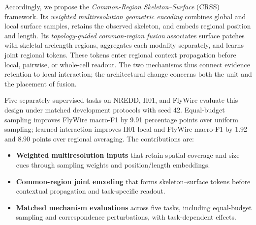 Accordingly, we propose the \emph{Common-Region Skeleton--Surface} (CRSS) framework. Its \emph{weighted multiresolution geometric encoding} combines global and local surface samples, retains the observed skeleton, and embeds regional position and length. Its \emph{topology-guided common-region fusion} associates surface patches with skeletal arclength regions, aggregates each modality separately, and learns joint regional tokens. These tokens enter regional context propagation before local, pairwise, or whole-cell readout. The two mechanisms thus connect evidence retention to local interaction; the architectural change concerns both the unit and the placement of fusion.

Five separately supervised tasks on NREDD, H01, and FlyWire evaluate this design under matched development protocols with seed 42. Equal-budget sampling improves FlyWire macro-F1 by 9.91 percentage points over uniform sampling; learned interaction improves H01 local and FlyWire macro-F1 by 1.92 and 8.90 points over regional averaging. The contributions are:

\begin{itemize}
\item
\textbf{Weighted multiresolution inputs} that retain spatial coverage and size cues through sampling weights and position/length embeddings.
\item
\textbf{Common-region joint encoding} that forms skeleton--surface tokens before contextual propagation and task-specific readout.
\item
\textbf{Matched mechanism evaluations} across five tasks, including equal-budget sampling and correspondence perturbations, with task-dependent effects.
\end{itemize}
